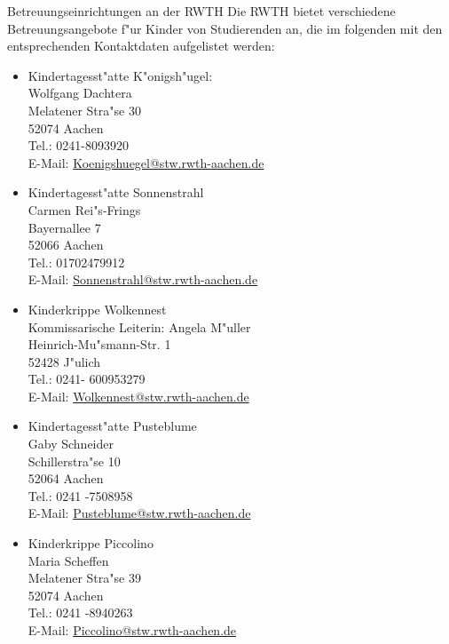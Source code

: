 \begin{artikel}{Betreuungseinrichtungen an der RWTH}
Die RWTH bietet verschiedene Betreuungsangebote f"ur Kinder von Studierenden an, die im folgenden mit den entsprechenden Kontaktdaten aufgelistet werden:

\begin{itemize}

\item Kindertagesst"atte K"onigsh"ugel:\\
Wolfgang Dachtera\\
Melatener Stra"se 30\\
52074 Aachen\\
Tel.: 0241-8093920\\
E-Mail: \href{mailto:Koenigshuegel@stw.rwth-aachen.de}{Koenigshuegel@stw.rwth-aachen.de}

\item Kindertagesst"atte Sonnenstrahl\\
Carmen Rei"s-Frings\\
Bayernallee 7\\
52066 Aachen\\
Tel.: 01702479912\\
E-Mail: \href{mailto:Sonnenstrahl@stw.rwth-aachen.de}{Sonnenstrahl@stw.rwth-aachen.de}


\item Kinderkrippe Wolkennest\\
Kommissarische Leiterin: Angela M"uller\\
Heinrich-Mu"smann-Str. 1\\
52428 J"ulich\\
Tel.: 0241- 600953279\\
E-Mail: \href{mailto:Wolkennest@stw.rwth-aachen.de}{Wolkennest@stw.rwth-aachen.de}

\item Kindertagesst"atte Pusteblume\\
Gaby Schneider\\
Schillerstra"se 10\\
52064 Aachen\\
Tel.: 0241 -7508958\\
E-Mail: \href{mailto:Pusteblume@stw.rwth-aachen.de}{Pusteblume@stw.rwth-aachen.de}


\item Kinderkrippe Piccolino\\
Maria Scheffen\\
Melatener Stra"se 39\\
52074 Aachen\\
Tel.: 0241 -8940263\\
E-Mail: \href{mailto:Piccolino@stw.rwth-aachen.de}{Piccolino@stw.rwth-aachen.de}


\end{itemize}
\end{artikel}

